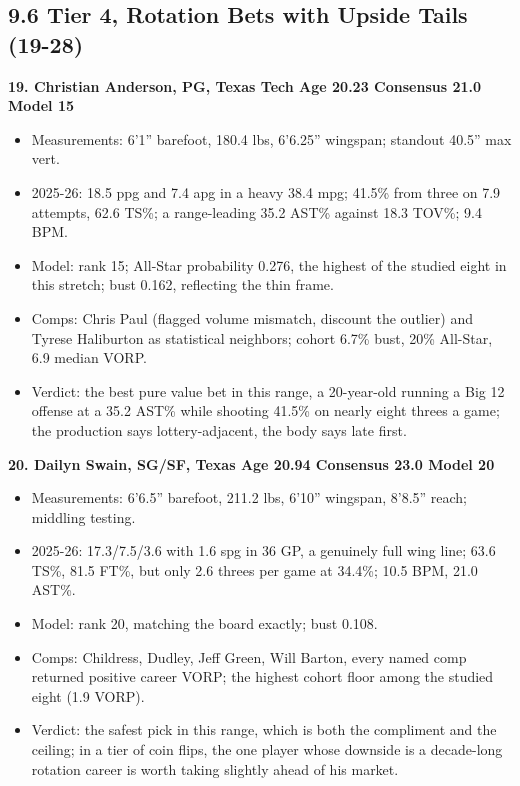 \documentclass[
  10pt,
]{article}
\providecommand{\tightlist}{%
  \setlength{\itemsep}{0pt}\setlength{\parskip}{0pt}}
\begin{document}
\subsection{9.6 Tier 4, Rotation Bets with Upside Tails
(19-28)}\label{tier-4-rotation-bets-with-upside-tails-19-28}

\textbf{19. Christian Anderson, PG, Texas Tech \textbar{} Age 20.23 \textbar{}
Consensus 21.0 \textbar{} Model 15}

\begin{itemize}
\tightlist
\item
  Measurements: 6'1'' barefoot, 180.4 lbs, 6'6.25'' wingspan; standout 40.5''
  max vert.
\item
  2025-26: 18.5 ppg and 7.4 apg in a heavy 38.4 mpg; 41.5\% from three on 7.9
  attempts, 62.6 TS\%; a range-leading 35.2 AST\% against 18.3 TOV\%; 9.4 BPM.
\item
  Model: rank 15; All-Star probability 0.276, the highest of the studied eight
  in this stretch; bust 0.162, reflecting the thin frame.
\item
  Comps: Chris Paul (flagged volume mismatch, discount the outlier) and Tyrese
  Haliburton as statistical neighbors; cohort 6.7\% bust, 20\% All-Star, 6.9
  median VORP.
\item
  Verdict: the best pure value bet in this range, a 20-year-old running a Big 12
  offense at a 35.2 AST\% while shooting 41.5\% on nearly eight threes a game;
  the production says lottery-adjacent, the body says late first.
\end{itemize}

\textbf{20. Dailyn Swain, SG/SF, Texas \textbar{} Age 20.94 \textbar{} Consensus
23.0 \textbar{} Model 20}

\begin{itemize}
\tightlist
\item
  Measurements: 6'6.5'' barefoot, 211.2 lbs, 6'10'' wingspan, 8'8.5'' reach;
  middling testing.
\item
  2025-26: 17.3/7.5/3.6 with 1.6 spg in 36 GP, a genuinely full wing line; 63.6
  TS\%, 81.5 FT\%, but only 2.6 threes per game at 34.4\%; 10.5 BPM, 21.0 AST\%.
\item
  Model: rank 20, matching the board exactly; bust 0.108.
\item
  Comps: Childress, Dudley, Jeff Green, Will Barton, every named comp returned
  positive career VORP; the highest cohort floor among the studied eight (1.9
  VORP).
\item
  Verdict: the safest pick in this range, which is both the compliment and the
  ceiling; in a tier of coin flips, the one player whose downside is a
  decade-long rotation career is worth taking slightly ahead of his market.
\end{itemize}
\end{document}
